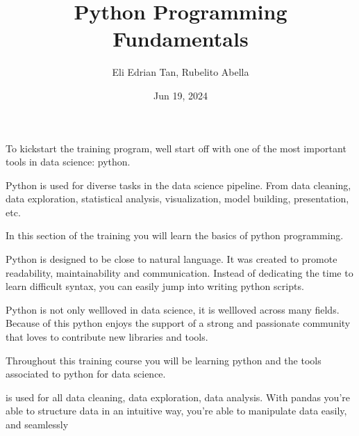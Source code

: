 \documentclass[letterpaper,10pt,english]{jupyterBook}
\title{Python Programming Fundamentals}
\date{Jun 19, 2024}
\author{Eli Edrian Tan, Rubelito Abella}
\begin{document}
\pagestyle{empty}
\sphinxmaketitle
\pagestyle{plain}
\sphinxtableofcontents
\pagestyle{normal}
\label{\detokenize{intro::doc}}


\sphinxAtStartPar
To kickstart the training program, well start off with one of the most important tools in data science: python.

\sphinxAtStartPar
Python is used for diverse tasks in the data science pipeline. From data cleaning, data exploration, statistical analysis, visualization, model building, presentation, etc.

\sphinxAtStartPar
In this section of the training you will learn the basics of python programming.

\begin{DUlineblock}{0em}
\item[] 
\end{DUlineblock}

\sphinxAtStartPar
Python is designed to be close to natural language. It was created to promote readability, maintainability and communication. Instead of dedicating the time to learn difficult syntax, you can easily jump into writing python scripts.

\begin{DUlineblock}{0em}
\item[] 
\end{DUlineblock}

\sphinxAtStartPar
Python is not only well\sphinxhyphen{}loved in data science, it is well\sphinxhyphen{}loved across many fields. Because of this python enjoys the support of a strong and passionate community that loves to contribute new libraries and tools.

\begin{DUlineblock}{0em}
\item[] 
\end{DUlineblock}

\sphinxAtStartPar
Throughout this training course you will be learning python and the tools associated to python for data science.

\begin{DUlineblock}{0em}
\item[] 
\end{DUlineblock}

\sphinxAtStartPar
{} is used for all data cleaning, data exploration, data analysis. With pandas you’re able to structure data in an intuitive way, you’re able to manipulate data easily, and seamlessly
\end{document}
